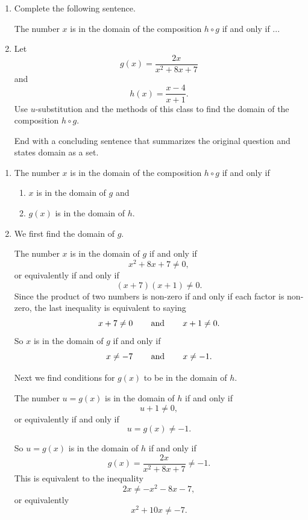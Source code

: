 \documentclass{ximera}
\begin{document}
\begin{question} \label{QQA232}
\begin{enumerate}

\item Complete the following sentence.

The number $x$ is in the domain of the composition $h\circ g$ if and only if ...


\item  Let 
\[
 g(x) = \frac{2x}{x^2+8x+7}
\]
and
\[
   h(x) =      \frac{x-4}{x+1}.
\]
Use $u$-substitution and the methods of this class to find the domain of the composition $h\circ g$.

End with a concluding sentence that summarizes the original question and states domain as a set.

\end{enumerate}

\begin{explanation}
\begin{enumerate}
\item The number $x$ is in the domain of the composition $h\circ g$ if and only if
\begin{enumerate}
\item $x$ is in the domain of $g$ and

\item $g(x)$ is in the domain of $h$.
\end{enumerate}

\item We first find the domain of $g$. 

The number $x$ is in the domain of $g$ if and only if
\[
  x^2 + 8x + 7 \neq 0, 
\]
or equivalently if and only if
\[
   (x+7)(x+1) \neq 0.
\]
Since the product of two numbers is non-zero if and only if each factor is non-zero, the last inequality is equivalent to saying
\[
 x + 7 \neq 0  \hskip 0.3in \text{and} \hskip 0.3 in  x+1 \neq 0.
\]
So $x$ is in the domain of $g$ if and only if
\[
  x  \neq -7  \hskip 0.3in \text{and} \hskip 0.3 in  x \neq -1.
\]

Next we find conditions for $g(x)$ to be in the domain of $h$. 

The number $u=g(x)$ is in the domain of $h$ if and only if 
\[
  u+1 \neq 0,
\]
or equivalently if and only if
\[
    u = g(x) \neq -1.
\]

So $u=g(x)$ is in the domain of $h$ if and only if
\[
     g(x) = \frac{2x}{x^2+8x+7} \neq -1.
\]
This is equivalent to the inequality
\[
  2x \neq -x^2 -8x -7 ,
\]
or equivalently
\[
  x^2 +10x \neq -7.
\]


\end{enumerate}
\end{explanation}
\end{question}
\end{document}

